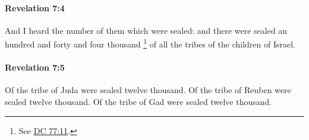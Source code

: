 		\paragraph{Revelation 7:4} %
			\label{REVELATIONNT-7-4}

			And I heard the number of them which were sealed: and there were sealed an hundred and forty and four thousand%
				\footnote{%
					See \hyperref[DC77-11]{DC 77:11}.
					}
			of all the tribes of the children of Israel.

			\begin{framed}
			\scriptsize
				\begin{compactdesc}
					\item[SBLG] 
				\end{compactdesc}
			\end{framed}

		\paragraph{Revelation 7:5} %
			\label{REVELATIONNT-7-5}

			Of the tribe of Juda were sealed twelve thousand. Of the tribe of Reuben were sealed twelve thousand. Of the tribe of Gad were sealed twelve thousand.

